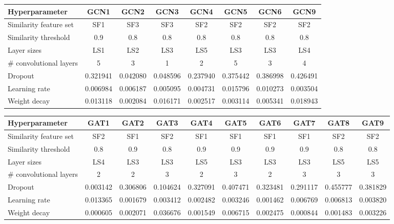 \begin{sidewaystable}[h!]
    \caption{Shortlisted population graph and GCN model parameter combinations during the model selection process.}
    \centering
    \small
    \begin{tabular}{lccccccc}
        \hline
    \textbf{Hyperparameter} & \textbf{GCN1} & \textbf{GCN2} & \textbf{GCN3} & \textbf{GCN4} & \textbf{GCN5} & \textbf{GCN6} & \textbf{GCN9} \\  \hline
        Similarity feature set &  SF1 & SF3 & SF3 & SF2 & SF2 & SF2 & SF2 \\
        Similarity threshold & 0.9 & 0.8 & 0.8 & 0.8 & 0.8 & 0.8 & 0.8\\ \hline
        Layer sizes & LS1 &  LS2 & LS3 & LS5 & LS3 & LS3 & LS4 \\ 
        \# convolutional layers & 5 & 3& 1& 2& 5& 3& 4\\ 
        Dropout &  0.321941 & 0.042080& 0.048596& 0.237940& 0.375442& 0.386998& 0.426491\\ 
        Learning rate & 0.006984& 0.006187& 0.005095& 0.004731& 0.015796& 0.010273& 0.003504\\ 
        Weight decay & 0.013118& 0.002084& 0.016171& 0.002517& 0.003114& 0.005341& 0.018943\\ \hline
\end{tabular}
 
\bigskip\bigskip

    \caption{Shortlisted population graph and GAT model parameter combinations during the model selection process.}
    \centering
    \small
    \begin{tabular}{lccccccccc}
        \hline
    \textbf{Hyperparameter} & \textbf{GAT1} & \textbf{GAT2} & \textbf{GAT3} & \textbf{GAT4} & \textbf{GAT5} & \textbf{GAT6} & \textbf{GAT7} & \textbf{GAT8} & \textbf{GAT9} \\  \hline
    Similarity feature set & SF2 & SF1 & SF2& SF1 & SF1& SF1& SF1& SF2& SF2\\
    Similarity threshold & 0.8 & 0.9& 0.8& 0.9& 0.9& 0.9& 0.9& 0.8& 0.8\\ \hline
    Layer sizes& LS4& LS3& LS3& LS5& LS3& LS3& LS3& LS5& LS5\\
    \# convolutional layers & 2& 2& 3& 2& 3& 2& 3& 3& 3\\
    Dropout & 0.003142& 0.306806& 0.104624& 0.327091& 0.407471& 0.323481& 0.291117& 0.455777& 0.381829\\
    Learning rate& 0.013365& 0.001679& 0.003412& 0.002482& 0.003246& 0.001462& 0.006769& 0.006813& 0.003820\\
    Weight decay& 0.000605& 0.002071& 0.036676& 0.001549& 0.006715& 0.002475& 0.000844& 0.001483& 0.003226\\ \hline
\end{tabular}
    \end{sidewaystable}
